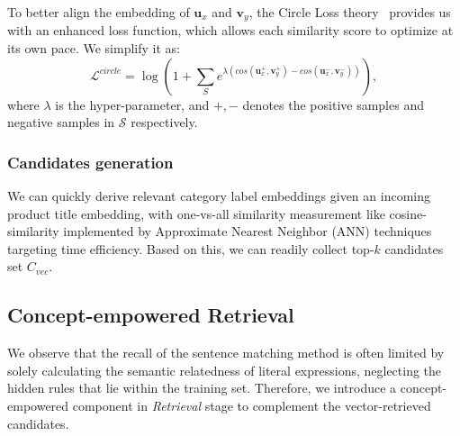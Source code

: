 
To better align the embedding of $\mathbf{u}_x$ and $\mathbf{v}_y$, the Circle Loss theory~\cite{sun2020circle} provides us with an enhanced loss function, which allows each similarity score to optimize at its own pace. We simplify it as:
\begin{equation}
    \mathcal{L}^{circle}=\log \left(1+\sum_{S} e^{\lambda (cos(\mathbf{u}_x^+,\mathbf{v}_y^+)-cos(\mathbf{u}_x^-,\mathbf{v}_y^-))}\right),
\end{equation}
where $\lambda$ is the hyper-parameter, and $+,-$ denotes the positive samples and negative samples in $\mathcal{S}$ respectively.
\subsubsection{Candidates generation}
We can quickly derive relevant category label embeddings given an incoming product title embedding, with one-vs-all similarity measurement like cosine-similarity
implemented by Approximate Nearest Neighbor (ANN) techniques targeting time efficiency.
Based on this, we can readily 
collect top-$k$ candidates set $C_{vec}$. 
\subsection{Concept-empowered Retrieval}
We observe that the recall of the sentence matching method is often limited by solely calculating the semantic relatedness of literal expressions, neglecting the hidden rules that lie within the training set. 
Therefore, we introduce a concept-empowered component in \textit{Retrieval} stage to complement the vector-retrieved candidates.

